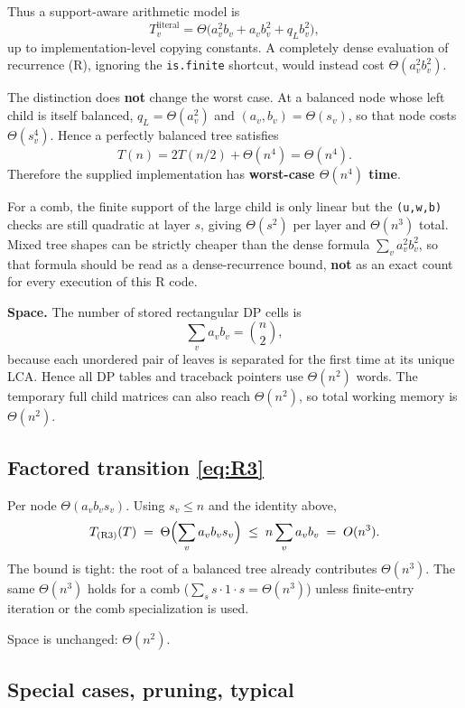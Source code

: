 \documentclass[11pt]{article}
\theoremstyle{plain}
\begin{document}
Thus a support-aware arithmetic model is
\[
T_v^{\text{literal}}
=
\Theta\bigl(a_v^2 b_v + a_v b_v^2 + q_L b_v^2\bigr),
\]
up to implementation-level copying constants. A completely dense evaluation of
recurrence (R), ignoring the \texttt{is.finite} shortcut, would instead cost
\(\Theta(a_v^2b_v^2)\).

The distinction does \textbf{not} change the worst case. At a balanced node
whose left child is itself balanced, \(q_L=\Theta(a_v^2)\) and
\((a_v,b_v)=\Theta(s_v)\), so that node costs \(\Theta(s_v^4)\). Hence a
perfectly balanced tree satisfies
\[
T(n)=2T(n/2)+\Theta(n^4)=\Theta(n^4).
\]
Therefore the supplied implementation has \textbf{worst-case \(\Theta(n^4)\)
time}.

For a comb, the finite support of the large child is only linear but the
\texttt{(u,w,b)} checks are still quadratic at layer \(s\), giving
\(\Theta(s^2)\) per layer and \(\Theta(n^3)\) total. Mixed tree shapes can be
strictly cheaper than the dense formula \(\sum_v a_v^2b_v^2\), so that formula
should be read as a dense-recurrence bound, \textbf{not} as an exact count for
every execution of this R code.

\textbf{Space.} The number of stored rectangular DP cells is
\[
\sum_v a_vb_v=\binom{n}{2},
\]
because each unordered pair of leaves is separated for the first time at its
unique LCA. Hence all DP tables and traceback pointers use \(\Theta(n^2)\)
words. The temporary full child matrices can also reach \(\Theta(n^2)\), so
total working memory is \(\Theta(n^2)\).

\subsection{Factored transition \eqref{eq:R3}}

Per node \(\Theta(a_v b_v s_v)\). Using \(s_v \le n\) and the identity above,
\[
T_{\mathrm{(R3)}}(T)
\;=\;
\Theta\Bigl(\sum_v a_v b_v s_v\Bigr)
\;\le\;
n \sum_v a_v b_v
\;=\;
O(n^3).
\]
The bound is tight: the root of a balanced tree already contributes
\(\Theta(n^3)\). The same \(\Theta(n^3)\) holds for a comb
(\(\sum_s s\cdot 1\cdot s = \Theta(n^3)\)) unless finite-entry iteration or
the comb specialization is used.

Space is unchanged: \(\Theta(n^2)\).

\subsection{Special cases, pruning, typical}
\end{document}
